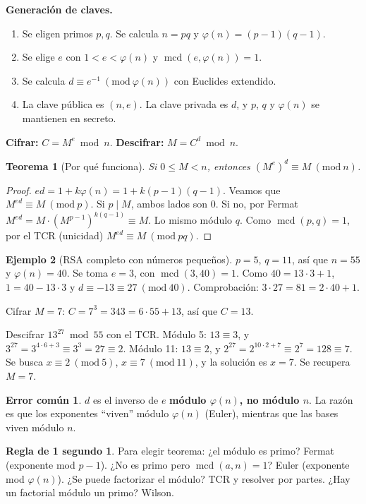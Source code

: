 \documentclass[11pt,a4paper]{article}
\newtheorem{teorema}{Teorema}[section]
\theoremstyle{definition}
\newtheorem{ejemplo}[teorema]{Ejemplo}
\newcommand{\md}[1]{\ (\mathrm{mod}\ #1)}
\newcommand{\mcd}{\operatorname{mcd}}
\theoremstyle{notait}
\theoremstyle{nota}
\newtheorem*{regla}{Regla de 1 segundo}
\newtheorem*{trampaX}{Error común}
\newenvironment{trampa}{\begin{trampaX}\leavevmode\marginpar{\raggedleft\vspace*{-0.9\baselineskip}\dbend}\ignorespaces}{\end{trampaX}}
\begin{document}
\textbf{Generación de claves.}
\begin{enumerate}
\item Se eligen primos $p,q$. Se calcula $n=pq$ y $\varphi(n)=(p-1)(q-1)$.
\item Se elige $e$ con $1<e<\varphi(n)$ y $\mcd(e,\varphi(n))=1$.
\item Se calcula $d\equiv e^{-1}\md{\varphi(n)}$ con Euclides extendido.
\item La clave pública es $(n,e)$. La clave privada es $d$, y $p$, $q$ y $\varphi(n)$ se mantienen en secreto.
\end{enumerate}
\textbf{Cifrar:} $C=M^e\bmod n$. \textbf{Descifrar:} $M=C^d\bmod n$.

\begin{teorema}[Por qué funciona]
Si $0\le M<n$, entonces $(M^e)^d\equiv M\md n$.
\end{teorema}
\begin{proof}
$ed=1+k\varphi(n)=1+k(p-1)(q-1)$. Veamos que $M^{ed}\equiv M\md p$. Si $p\mid M$, ambos lados son $0$. Si no, por Fermat $M^{ed}=M\cdot(M^{p-1})^{k(q-1)}\equiv M$. Lo mismo módulo $q$. Como $\mcd(p,q)=1$, por el TCR (unicidad) $M^{ed}\equiv M\md{pq}$.
\end{proof}

\begin{ejemplo}[RSA completo con números pequeños]
$p=5$, $q=11$, así que $n=55$ y $\varphi(n)=40$. Se toma $e=3$, con $\mcd(3,40)=1$. Como $40=13\cdot3+1$, $1=40-13\cdot3$ y $d\equiv-13\equiv27\md{40}$. Comprobación: $3\cdot27=81=2\cdot40+1$.

Cifrar $M=7$: $C=7^3=343=6\cdot55+13$, así que $C=13$.

Descifrar $13^{27}\bmod55$ con el TCR. Módulo 5: $13\equiv3$, y $3^{27}=3^{4\cdot6+3}\equiv3^3=27\equiv2$. Módulo 11: $13\equiv2$, y $2^{27}=2^{10\cdot2+7}\equiv2^7=128\equiv7$. Se busca $x\equiv2\md5$, $x\equiv7\md{11}$, y la solución es $x=7$. Se recupera $M=7$.
\end{ejemplo}

\begin{trampa}
$d$ es el inverso de $e$ \textbf{módulo $\varphi(n)$, no módulo $n$}. La razón es que los exponentes ``viven'' módulo $\varphi(n)$ (Euler), mientras que las bases viven módulo $n$.
\end{trampa}

\begin{regla}
Para elegir teorema: ¿el módulo es primo? Fermat (exponente mod $p-1$). ¿No es primo pero $\mcd(a,n)=1$? Euler (exponente mod $\varphi(n)$). ¿Se puede factorizar el módulo? TCR y resolver por partes. ¿Hay un factorial módulo un primo? Wilson.
\end{regla}
\end{document}
